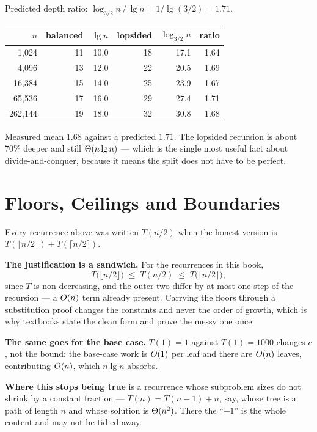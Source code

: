 \begin{worked}
Predicted depth ratio: $\log_{3/2} n \,/\, \lg n = 1/\lg(3/2) = 1.71$.

\begin{center}
\begin{tabular}{@{}rrrrrr@{}}
\toprule
\rowcolor{primary!15}
$n$ & balanced & $\lg n$ & lopsided & $\log_{3/2} n$ & ratio \\
\midrule
  1{,}024 & 11 & 10.0 & 18 & 17.1 & 1.64 \\
  4{,}096 & 13 & 12.0 & 22 & 20.5 & 1.69 \\
 16{,}384 & 15 & 14.0 & 25 & 23.9 & 1.67 \\
 65{,}536 & 17 & 16.0 & 29 & 27.4 & 1.71 \\
262{,}144 & 19 & 18.0 & 32 & 30.8 & 1.68 \\
\bottomrule
\end{tabular}
\end{center}

\smallskip
Measured mean $1.68$ against a predicted $1.71$. The lopsided recursion is
about 70\% deeper and still $\Theta(n \operatorname{lg} n)$ --- which is the single most
useful fact about divide-and-conquer, because it means the split does not have
to be perfect.
\end{worked}

\section{Floors, Ceilings and Boundaries}

\begin{conceptbox}
Every recurrence above was written $T(n/2)$ when the honest version is
$T(\lfloor n/2\rfloor) + T(\lceil n/2 \rceil)$.

\smallskip
\textbf{The justification is a sandwich.} For the recurrences in this book,
\[ T\bigl(\lfloor n/2 \rfloor\bigr) \;\le\; T(n/2) \;\le\;
   T\bigl(\lceil n/2 \rceil\bigr), \]
since $T$ is non-decreasing, and the outer two differ by at most one step of
the recursion --- a $O(n)$ term already present. Carrying the floors
through a substitution proof changes the constants and never the order of
growth, which is why textbooks state the clean form and prove the messy one
once.

\smallskip
\textbf{The same goes for the base case.} $T(1) = 1$ against $T(1) = 1000$
changes $c$, not the bound: the base-case work is $O(1)$ per leaf and
there are $O(n)$ leaves, contributing $O(n)$, which $n\lg n$ absorbs.

\smallskip
\textbf{Where this stops being true} is a recurrence whose subproblem sizes do
not shrink by a constant fraction --- $T(n) = T(n-1) + n$, say, whose tree is a
path of length $n$ and whose solution is $\Theta(n^{2})$. There the ``$-1$''
is the whole content and may not be tidied away.
\end{conceptbox}

